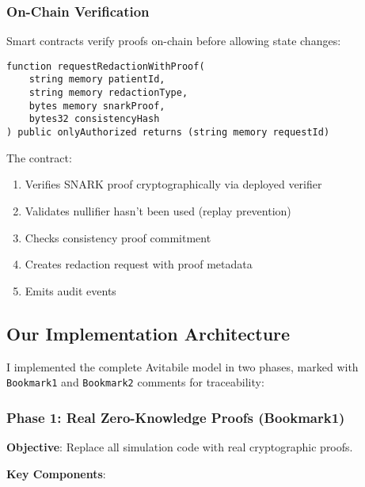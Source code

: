 \subsubsection{On-Chain Verification}

Smart contracts verify proofs on-chain before allowing state changes:

\begin{verbatim}
function requestRedactionWithProof(
    string memory patientId,
    string memory redactionType,
    bytes memory snarkProof,
    bytes32 consistencyHash
) public onlyAuthorized returns (string memory requestId)
\end{verbatim}

The contract:
\begin{enumerate}
    \item Verifies SNARK proof cryptographically via deployed verifier
    \item Validates nullifier hasn't been used (replay prevention)
    \item Checks consistency proof commitment
    \item Creates redaction request with proof metadata
    \item Emits audit events
\end{enumerate}

\subsection{Our Implementation Architecture}

I implemented the complete Avitabile model in two phases, marked with \texttt{Bookmark1} and \texttt{Bookmark2} comments for traceability:

\subsubsection{Phase 1: Real Zero-Knowledge Proofs (Bookmark1)}

\textbf{Objective}: Replace all simulation code with real cryptographic proofs.

\textbf{Key Components}:

